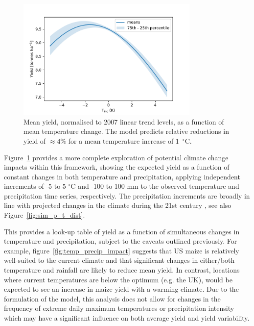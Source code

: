 \documentclass[12pt]{article}
\begin{document}
\begin{figure}
\centering
\includegraphics[width=0.8\textwidth]{./figures/temperature_impact2_m5p5}
\caption{\label{fig:yield_responses} Mean yield, normalised to 2007 linear trend levels, as a function of mean temperature change. The model predicts relative reductions in yield of $\approx 4$\% for a mean temperature increase of 1~$^\circ$C. }
\end{figure}

Figure~\ref{fig:yield_responses} provides a more complete exploration of potential climate change impacts within this framework, showing the expected yield as a function of constant changes in both temperature and precipitation, applying independent increments of -5 to 5 $^\circ$C and -100 to 100 mm to the observed temperature and precipitation time series, respectively. The precipitation increments are broadly in line with projected changes in the climate during the 21st century \citep{usgcrp:2017}, see also Figure~\ref{fig:sim_p_t_dist}. 

This provides a look-up table of yield as a function of simultaneous changes in temperature and precipitation, subject to the caveats outlined previously. For example, figure~\ref{fig:temp_precip_impact} suggests that US maize is relatively well-suited to the current climate and that significant changes in either/both temperature and rainfall are likely to reduce mean yield. In contrast, locations where current temperatures are below the optimum (e.g. the UK), would be expected to see an increase in maize yield with a warming climate. Due to the formulation of the model, this analysis does not allow for changes in the frequency of extreme daily maximum temperatures or precipitation intensity which may have a significant influence on both average yield and yield variability.
\end{document}
